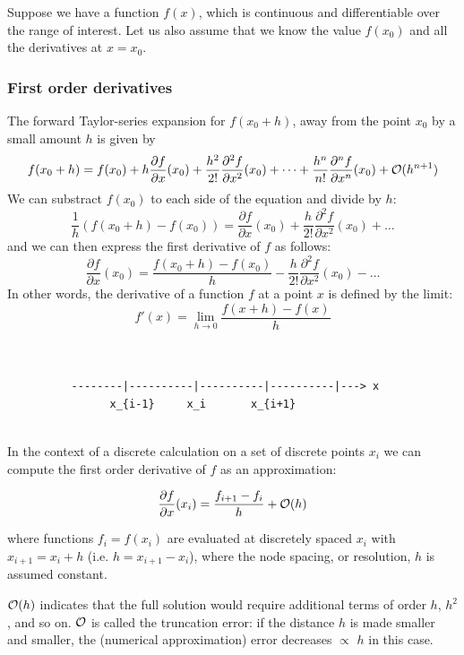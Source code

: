 Suppose we have a function $f(x)$, which is continuous and differentiable over the range of interest. 
Let us also assume that we know the value $f(x_0)$ and all the derivatives at $x = x_0$. 

\subsubsection{First order derivatives}

The forward Taylor-series expansion for $f(x_0 + h)$, away 
from the point $x_0$ by a small amount $h$ is given by
\[
f(x_0+h)=f(x_0)+ 
h \frac{\partial f}{\partial x}(x_0)  + 
\frac{h^2}{2!} \frac{\partial^2 f}{\partial x^2}(x_0)  +
\dots  +
\frac{h^n}{n!} \frac{\partial^n f}{\partial x^n}(x_0)  
+ {\cal O}(h^{n+1})
\]
We can substract $f(x_0)$ to each side of the equation and divide by $h$:
\[
\frac{1}{h} (f(x_0+h)-f(x_0)) = 
 \frac{\partial f}{\partial x}(x_0)  + 
\frac{h}{2!} \frac{\partial^2 f}{\partial x^2}(x_0)  + \dots 
\]
and we can then express the first derivative of $f$ as follows:
\[
\frac{\partial f}{\partial x}(x_0) = \frac{f(x_0+h)-f(x_0)}{h} - 
\frac{h}{2!} \frac{\partial^2 f}{\partial x^2}(x_0) - \dots
\]
In other words, the derivative of a function $f$ at a point $x$ 
is defined by the limit:
\[
f'(x)=\lim_{h\rightarrow 0} \frac{f(x+h)-f(x)}{h}
\]


\begin{verbatim}


          --------|----------|----------|----------|---> x
                x_{i-1}     x_i       x_{i+1}


\end{verbatim}

In the context of a discrete calculation on a set of discrete points $x_i$
we can compute the first order derivative of $f$ as an approximation:
\begin{mdframed}[backgroundcolor=blue!5]
\[
\frac{\partial f}{\partial x}(x_i) = \frac{f_{i+1}-f_i}{h} + {\cal O}(h) 
\]
\end{mdframed}
where functions $f_i = f (x_i)$ are evaluated at discretely spaced $x_i$ with $x_{i+1} = x_i + h$ 
(i.e. $h=x_{i+1}-x_i$), where the node spacing, or resolution, $h$ is assumed constant.


${\cal O}(h)$ indicates that the full solution would require additional terms of order $h$, $h^2$, 
and so on. ${\cal O}$ is called the {\color{olive}truncation error}: if the distance $h$ is made smaller and smaller,
the (numerical approximation) error decreases $\propto$ $h$ in this case.

